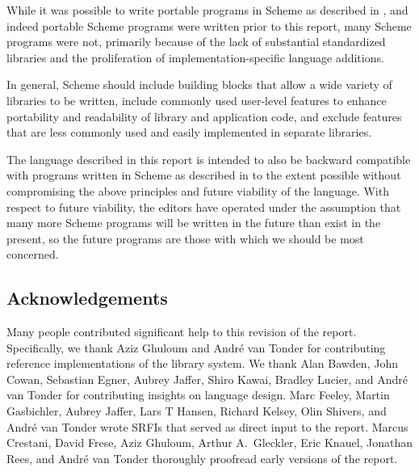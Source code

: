 While it was possible to write portable programs in Scheme as
described in , and indeed portable Scheme programs were written
prior to this report, many Scheme programs were not, primarily because
of the lack of substantial standardized libraries and the
proliferation of implementation-specific language additions.

In general, Scheme should include building blocks that allow a wide
variety of libraries to be written, include commonly used user-level
features to enhance portability and readability of library and
application code, and exclude features that are less commonly used and
easily implemented in separate libraries.

The language described in this report is intended to also be backward
compatible with programs written in Scheme as described in  to
the extent possible without compromising the above principles and
future viability of the language.  With respect to future viability,
the editors have operated under the assumption that many more Scheme
programs will be written in the future than exist in the present, so
the future programs are those with which we should be most concerned.

\subsection*{Acknowledgements}

Many people contributed significant help to this revision of the
report.  Specifically, we thank Aziz Ghuloum and Andr\'e van Tonder for
contributing reference implementations of the library system.  We
thank Alan Bawden, John Cowan, Sebastian Egner, Aubrey Jaffer, Shiro
Kawai, Bradley Lucier, and Andr\'e van Tonder for contributing insights on
language design.  Marc Feeley, Martin Gasbichler, Aubrey Jaffer, Lars T Hansen,
Richard Kelsey, Olin Shivers, and Andr\'e van Tonder wrote SRFIs that
served as direct input to the report.  Marcus Crestani, David Frese,
Aziz Ghuloum, Arthur A.\ Gleckler, Eric Knauel, Jonathan Rees, and Andr\'e
van Tonder thoroughly proofread early versions of the report.


